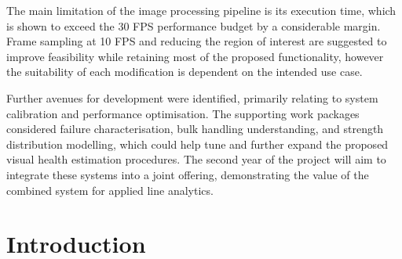 \documentclass[10pt]{article}
\begin{document}
The main limitation of the image processing pipeline is its execution time, which is shown to exceed the 30 FPS performance budget by a considerable margin. Frame sampling at 10 FPS and reducing the region of interest are suggested to improve feasibility while retaining most of the proposed functionality, however the suitability of each modification is dependent on the intended use case.

Further avenues for development were identified, primarily relating to system calibration and performance optimisation. The supporting work packages considered failure characterisation, bulk handling understanding, and strength distribution modelling, which could help tune and further expand the proposed visual health estimation procedures. The second year of the project will aim to integrate these systems into a joint offering, demonstrating the value of the combined system for applied line analytics.

\clearpage


\tableofcontents
\clearpage

\listoffigures
\clearpage


\section{Introduction}
\end{document}
